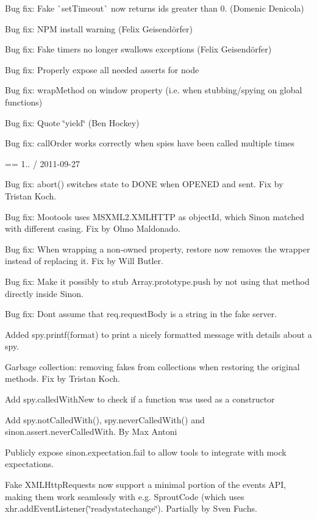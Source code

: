 \begin{DoxyItemize}
\item Bug fix\+: Fake \`{}set\+Timeout\`{} now returns ids greater than 0. (Domenic Denicola)
\item Bug fix\+: N\+PM install warning (Felix Geisendörfer)
\item Bug fix\+: Fake timers no longer swallows exceptions (Felix Geisendörfer)
\item Bug fix\+: Properly expose all needed asserts for node
\item Bug fix\+: wrap\+Method on window property (i.\+e. when stubbing/spying on global functions)
\item Bug fix\+: Quote \char`\"{}yield\char`\"{} (Ben Hockey)
\item Bug fix\+: call\+Order works correctly when spies have been called multiple times
\end{DoxyItemize}

== 1.. / 2011-\/09-\/27
\begin{DoxyItemize}
\item Bug fix\+: abort() switches state to D\+O\+NE when O\+P\+E\+N\+ED and sent. Fix by Tristan Koch.
\item Bug fix\+: Mootools uses M\+S\+X\+M\+L2.\+X\+M\+L\+H\+T\+TP as object\+Id, which Sinon matched with different casing. Fix by Olmo Maldonado.
\item Bug fix\+: When wrapping a non-\/owned property, restore now removes the wrapper instead of replacing it. Fix by Will Butler.
\item Bug fix\+: Make it possibly to stub Array.\+prototype.\+push by not using that method directly inside Sinon.
\item Bug fix\+: Don\textquotesingle{}t assume that req.\+request\+Body is a string in the fake server.
\item Added spy.\+printf(format) to print a nicely formatted message with details about a spy.
\item Garbage collection\+: removing fakes from collections when restoring the original methods. Fix by Tristan Koch.
\item Add spy.\+called\+With\+New to check if a function was used as a constructor
\item Add spy.\+not\+Called\+With(), spy.\+never\+Called\+With() and sinon.\+assert.\+never\+Called\+With. By Max Antoni
\item Publicly expose sinon.\+expectation.\+fail to allow tools to integrate with mock expectations.
\item Fake X\+M\+L\+Http\+Requests now support a minimal portion of the events A\+PI, making them work seamlessly with e.\+g. Sprout\+Code (which uses xhr.\+add\+Event\+Listener(\char`\"{}readystatechange\char`\"{}). Partially by Sven Fuchs.
\end{DoxyItemize}

